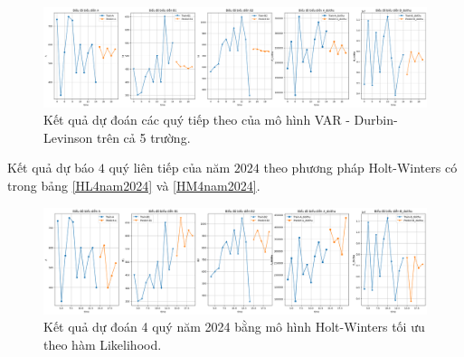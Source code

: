 \begin{figure}[H]
    \centering
    \includegraphics[width = \textwidth]{figure/preDB5.png}
     \caption{Kết quả dự đoán các quý tiếp theo của mô hình VAR - Durbin-Levinson trên cả 5 trường.}
\end{figure}
Kết quả dự báo $4$ quý liên tiếp của năm $2024$ theo phương pháp Holt-Winters có trong bảng \ref{HL4nam2024} và \ref{HM4nam2024}. 
\begin{table}[H]
    \centering
    \caption{Kết quả dự báo 4 quý năm 2024 bằng mô hình Holt-Winters tối ưu theo hàm Log-Likelihood.}
    \label{HL4nam2024}
\end{table} 

\begin{figure}[H]
    \centering
    \includegraphics[width = \textwidth]{figure/HW-likelihood.png}
     \caption{Kết quả dự đoán 4 quý năm 2024 bằng mô hình Holt-Winters tối ưu theo hàm Likelihood.}
\end{figure}

